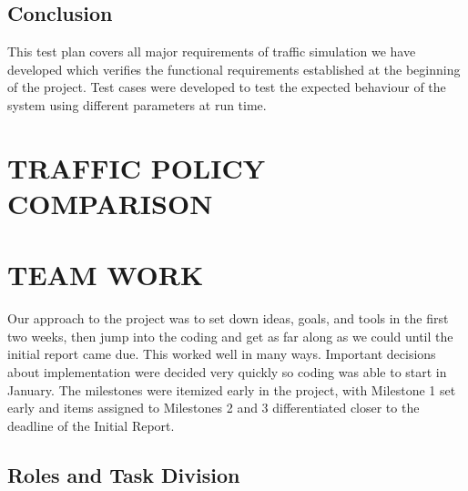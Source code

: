 \documentclass[11pt]{article}
\begin{document}
\begin{enumerate}
\subsection{Conclusion}
This test plan covers all major requirements of traffic simulation we have developed which verifies the functional requirements established at the beginning of the project. Test cases were developed to test the expected behaviour of the system using different parameters at run time.


\section{TRAFFIC POLICY COMPARISON}









\section{TEAM WORK}

Our approach to the project was to set down ideas, goals, and tools in the first two weeks, then jump into the coding and get as far along as we could until the initial report came due. This worked well in many ways. Important decisions about implementation were decided very quickly so coding was able to start in January. The milestones were itemized early in the project, with Milestone 1 set early and items assigned to Milestones 2 and 3 differentiated closer to the deadline of the Initial Report.


\subsection{Roles and Task Division}


\end{enumerate}
\end{document}
